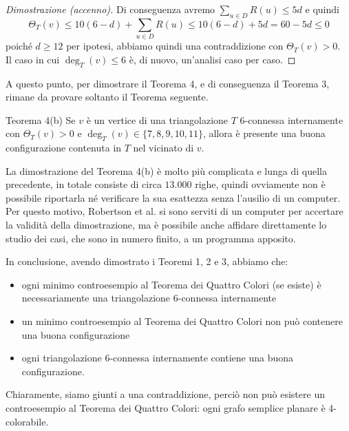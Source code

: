 \documentclass[a4paper,12pt,titlepage]{report}
\begin{document}
\begin{proof}[Dimostrazione (accenno)]
    \noindent Di conseguenza avremo $\sum_{u \in D} R(u) \leq 5d$ e quindi 
    \[
    \Theta_T(v) \leq 10(6 - d) + \sum_{u \in D} R(u) \leq 10(6 - d) +5d = 60 - 5d \leq 0
    \]
    poiché $d \geq 12$ per ipotesi, abbiamo quindi una contraddizione con $\Theta_T(v) > 0$.
    \\Il caso in cui $\deg_T(v) \leq 6$ è, di nuovo, un'analisi caso per caso.
    \end{proof}
    A questo punto, per dimostrare il Teorema 4, e di conseguenza il Teorema 3, rimane da provare soltanto il Teorema seguente.
    \begin{namedthm*}{Teorema 4(b)}
    	Se $v$ è un vertice di una triangolazione $T$ 6-connessa internamente con $\Theta_T(v) > 0$ e $\deg_T(v) \in \{7, 8, 9, 10, 11\}$, allora è presente una buona configurazione contenuta in $T$ nel vicinato di $v$.
    \end{namedthm*}
    La dimostrazione del Teorema 4(b) è molto più complicata e lunga di quella precedente, in totale consiste di circa $13.000$ righe, quindi ovviamente non è possibile riportarla né verificare la sua esattezza senza l'ausilio di un computer.
    \\Per questo motivo, Robertson et al. si sono serviti di un computer per accertare la validità della dimostrazione, ma è possibile anche affidare direttamente lo studio dei casi, che sono in numero finito, a un programma apposito. 
    
    In conclusione, avendo dimostrato i Teoremi 1, 2 e 3,
    abbiamo che:
    \begin{itemize}
    	\item ogni minimo controesempio al Teorema dei Quattro Colori (se esiste) è necessariamente una triangolazione 6-connessa internamente
    	\item un minimo controesempio al Teorema dei Quattro Colori non può contenere una buona configurazione
    	\item ogni triangolazione 6-connessa internamente contiene una buona configurazione.
    \end{itemize}
    Chiaramente, siamo giunti a una contraddizione, perciò non può esistere un controesempio al Teorema dei Quattro Colori: ogni grafo semplice planare è 4-colorabile.
    
    \newpage
    \null
    
\end{document}
